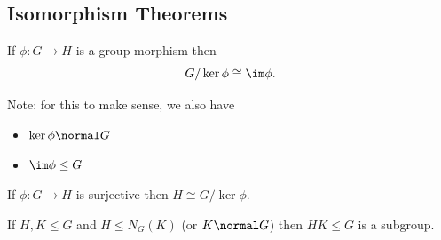 \hypertarget{isomorphism-theorems}{%
\subsection{Isomorphism Theorems}\label{isomorphism-theorems}}

\begin{theorem}

If \(\phi:G\to H\) is a group morphism then
\begin{align*}G/\ker \phi \cong \im \phi.\end{align*}

Note: for this to make sense, we also have

\begin{itemize}
\tightlist
\item
  \(\ker \phi \normal G\)
\item
  \(\im \phi \leq G\)
\end{itemize}

\end{theorem}

\begin{corollary}

If \(\phi: G\to H\) is surjective then \(H\cong G/\ker \phi\).

\end{corollary}

\begin{proposition}

If \(H,K \leq G\) and \(H \leq N_G(K)\) (or \(K \normal G\)) then
\(HK \leq G\) is a subgroup.

\end{proposition}


